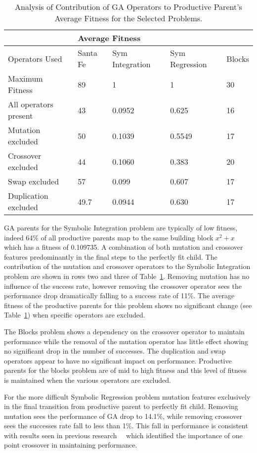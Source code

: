 \begin{table}[h]
\begin{center}
\begin{tabular}{|l|l|l|l|l|}
\hline
&\multicolumn{4}{|l|}{Average Fitness}\\
\hline
Operators Used  & Santa Fe & Sym Integration & Sym Regression & Blocks\\
\hline
Maximum Fitness & 89 & 1 & 1 & 30 \\
All operators present  & 43 &  0.0952 & 0.625  & 16\\
Mutation excluded  & 50 & 0.1039 & 0.5549 & 17 \\
Crossover excluded & 44 & 0.1060 & 0.383 & 20 \\
Swap excluded  & 57 & 0.099 & 0.607 & 17 \\
Duplication excluded & 49.7 & 0.0944 & 0.630 & 17\\
\hline
\end{tabular}
\caption{\label{pp2_table} Analysis of Contribution of GA Operators to Productive Parent's Average Fitness for the Selected Problems.}
\end{center}
\end{table}

GA parents for the Symbolic Integration problem are typically of low fitness, indeed 64\% of all productive parents map to the same building block $x^2 + x$ which has a fitness of 0.109735. A combination of both mutation and crossover features predominantly in the final steps to the perfectly fit child. The contribution of the mutation and crossover operators to the Symbolic Integration problem are shown in rows two and three of Table~\ref{pp2_table}. Removing mutation has no influence of the success rate, however removing the crossover operator sees the performance drop dramatically falling to a success rate of 11\%. The average fitness of the productive parents for this problem shows no significant change (see Table~\ref{pp2_table}) when specific operators are excluded. 


The Blocks problem shows a dependency on the crossover operator to maintain performance while the removal of the mutation operator has little effect showing no significant drop in the number of successes. The duplication and swap operators appear to have no significant impact on performance. Productive parents for the blocks problem are of mid to high fitness and this level of fitness is maintained when the various operators are excluded. 

For the more difficult Symbolic Regression problem mutation features exclusively in the final transition from productive parent to perfectly fit child. Removing mutation sees the performance of GA drop to 14.1\%, while removing crossover sees the successes rate fall to less than 1\%. This fall in performance is consistent with results seen in previous research~\cite{oneill}~\cite{oneill2} which identified the importance of one point crossover in maintaining performance. 

